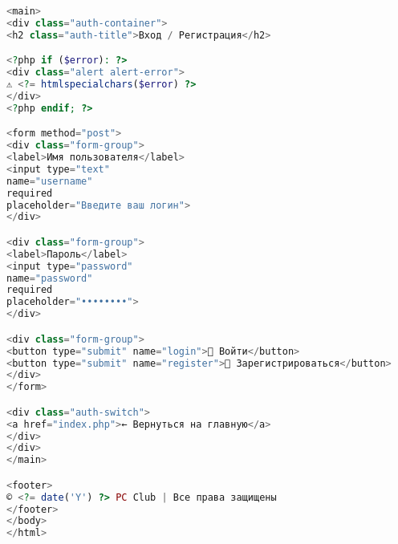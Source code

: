 \begin{lstlisting}[language=PHP,frame=none]
<main>
<div class="auth-container">
<h2 class="auth-title">Вход / Регистрация</h2>

<?php if ($error): ?>
<div class="alert alert-error">
⚠️ <?= htmlspecialchars($error) ?>
</div>
<?php endif; ?>

<form method="post">
<div class="form-group">
<label>Имя пользователя</label>
<input type="text" 
name="username" 
required
placeholder="Введите ваш логин">
</div>

<div class="form-group">
<label>Пароль</label>
<input type="password" 
name="password" 
required
placeholder="••••••••">
</div>

<div class="form-group">
<button type="submit" name="login">🚪 Войти</button>
<button type="submit" name="register">📝 Зарегистрироваться</button>
</div>
</form>

<div class="auth-switch">
<a href="index.php">← Вернуться на главную</a>
</div>
</div>
</main>

<footer>
© <?= date('Y') ?> PC Club | Все права защищены
</footer>
</body>
</html>
\end{lstlisting}

\clearpage
{}\fi
